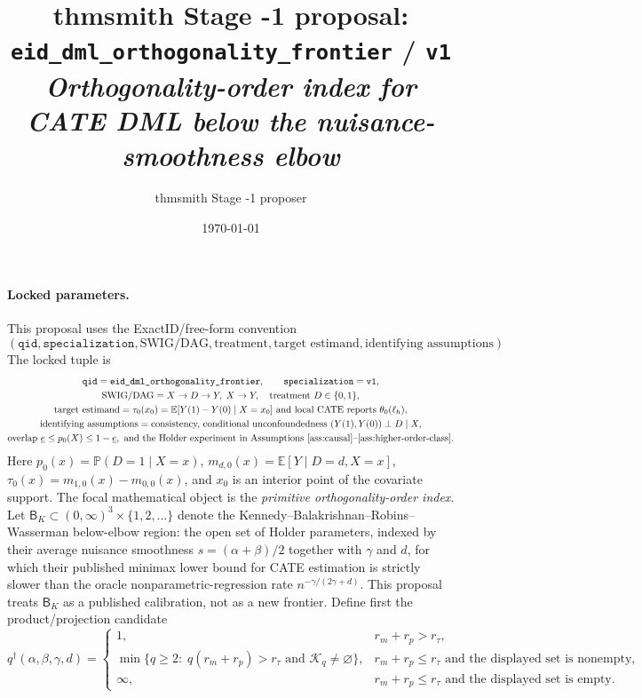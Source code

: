 \documentclass[11pt]{article}
\title{thmsmith Stage -1 proposal: \texttt{eid\_dml\_orthogonality\_frontier} / \texttt{v1}%
  \\ \large\textit{Orthogonality-order index for CATE DML below the nuisance-smoothness elbow}}
\author{thmsmith Stage -1 proposer}
\date{\today}
\newcommand{\E}{\mathbb{E}}
\renewcommand{\Pr}{\mathbb{P}}
\theoremstyle{definition}
\theoremstyle{plain}
\theoremstyle{remark}
\begin{document}
\maketitle


\paragraph{Locked parameters.}
This proposal uses the ExactID/free-form convention
\[
(\texttt{qid},\texttt{specialization},\text{SWIG/DAG},\text{treatment},
\text{target estimand},\text{identifying assumptions}).
\]
The locked tuple is
\[
\begin{gathered}
\texttt{qid}=\texttt{eid\_dml\_orthogonality\_frontier},\qquad
\texttt{specialization}=\texttt{v1},\\
\text{SWIG/DAG}=X\to D\to Y,\; X\to Y,\quad
\text{treatment }D\in\{0,1\},\\
\text{target estimand}=\tau_0(x_0)=\E[Y(1)-Y(0)\mid X=x_0]
\text{ and local CATE reports } \theta_0(\ell_h),\\
\text{identifying assumptions}=\text{consistency, conditional unconfoundedness }
(Y(1),Y(0))\perp D\mid X,\\
\text{overlap } \underline e\le p_0(X)\le 1-\underline e,\text{ and the Holder experiment in
Assumptions \ref{ass:causal}--\ref{ass:higher-order-class}.}
\end{gathered}
\]
Here \(p_0(x)=\Pr(D=1\mid X=x)\), \(m_{d,0}(x)=\E[Y\mid D=d,X=x]\),
\(\tau_0(x)=m_{1,0}(x)-m_{0,0}(x)\), and \(x_0\) is an interior point of
the covariate support.  The focal mathematical object is the
\emph{primitive orthogonality-order index}.  Let
\(\mathsf B_K\subset(0,\infty)^3\times\{1,2,\ldots\}\) denote the
Kennedy--Balakrishnan--Robins--Wasserman below-elbow region: the open set of
Holder parameters, indexed by their average nuisance smoothness
\(s=(\alpha+\beta)/2\) together with \(\gamma\) and \(d\), for which their
published minimax lower bound for CATE estimation is strictly slower than the
oracle nonparametric-regression rate \(n^{-\gamma/(2\gamma+d)}\).  This
proposal treats \(\mathsf B_K\) as a published calibration, not as a new
frontier.  Define first the product/projection candidate
\[
q^\dagger(\alpha,\beta,\gamma,d)=
\begin{cases}
1,& r_m+r_p>r_\tau,\\
\min\{q\ge2:\;q(r_m+r_p)>r_\tau\text{ and }\mathcal K_q\ne\varnothing\},
& r_m+r_p\le r_\tau\text{ and the displayed set is nonempty},\\
\infty,& r_m+r_p\le r_\tau\text{ and the displayed set is empty}.
\end{cases}
\]
\end{document}
